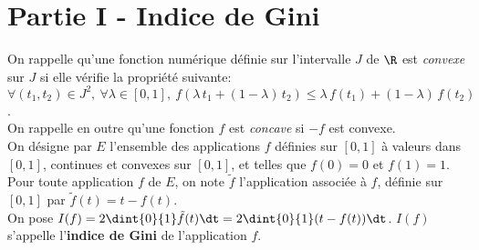 \section*{Partie I - Indice de Gini}

\noindent
On rappelle qu'une fonction numérique définie sur l'intervalle $J$ de 
$\R$ est \emph{convexe} sur $J$ si elle vérifie la propriété suivante: 
$\forall (t_1,t_2) \in J^2, \ \forall \lambda \in [0,1], \ f( \lambda 
\, t_1 + (1- \lambda) \, t_2) \leq \lambda \, f(t_1) + (1-\lambda ) \, 
f(t_2)$. \\
On rappelle en outre qu'une fonction $f$ est \emph{concave} si $-f$ est 
convexe.\\
On désigne par $E$ l'ensemble des applications $f$ définies sur $[0,1]$ 
à valeurs dans $[0,1]$, continues et convexes sur $[0,1]$, et telles 
que 
$f(0)=0$ et $f(1)=1$. Pour toute application $f$ de $E$, on note 
$\tilde{f}$ l'application associée à $f$, définie sur $[0,1]$ par 
$\tilde{f}(t)=t-f(t)$. \\[.1cm]
On pose $I(f)= 2\dint{0}{1} \tilde{f}(t) \dt= 
2\dint{0}{1}(t-f(t)) \dt$. $I(f)$ s'appelle l'\textbf{indice de Gini} 
de l'application $f$. 

